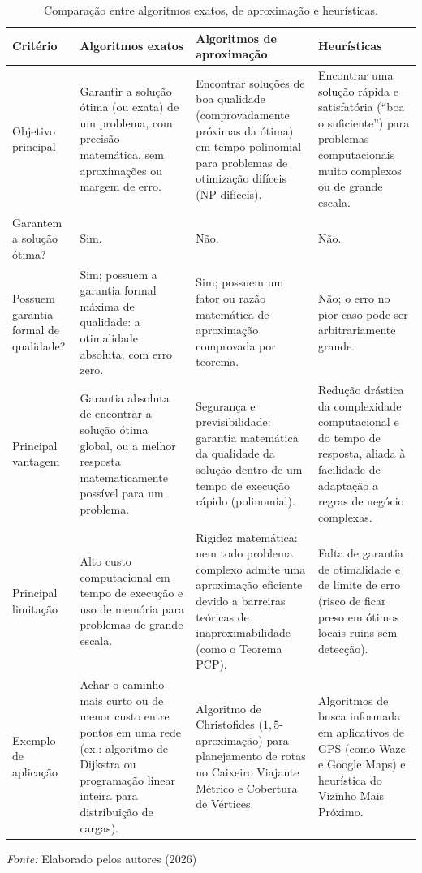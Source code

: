 \begin{table}[!ht]
\centering
\caption{Comparação entre algoritmos exatos, de aproximação e heurísticas.}
\label{tab:comparacao-abordagens}
\begin{tabular}{p{3.2cm}p{3.6cm}p{3.8cm}p{3.6cm}}
\hline
\textbf{Critério} & \textbf{Algoritmos exatos} & \textbf{Algoritmos de aproximação} & \textbf{Heurísticas} \\
\hline
Objetivo principal & Garantir a solução ótima (ou exata) de um problema, com precisão matemática, sem aproximações ou margem de erro. & Encontrar soluções de boa qualidade (comprovadamente próximas da ótima) em tempo polinomial para problemas de otimização difíceis (NP-difíceis). & Encontrar uma solução rápida e satisfatória (``boa o suficiente'') para problemas computacionais muito complexos ou de grande escala. \\
\hline
Garantem a solução ótima? & Sim. & Não. & Não. \\
\hline
Possuem garantia formal de qualidade? & Sim; possuem a garantia formal máxima de qualidade: a otimalidade absoluta, com erro zero. & Sim; possuem um fator ou razão matemática de aproximação comprovada por teorema. & Não; o erro no pior caso pode ser arbitrariamente grande. \\
\hline
Principal vantagem & Garantia absoluta de encontrar a solução ótima global, ou a melhor resposta matematicamente possível para um problema. & Segurança e previsibilidade: garantia matemática da qualidade da solução dentro de um tempo de execução rápido (polinomial). & Redução drástica da complexidade computacional e do tempo de resposta, aliada à facilidade de adaptação a regras de negócio complexas. \\
\hline
Principal limitação & Alto custo computacional em tempo de execução e uso de memória para problemas de grande escala. & Rigidez matemática: nem todo problema complexo admite uma aproximação eficiente devido a barreiras teóricas de inaproximabilidade (como o Teorema PCP). & Falta de garantia de otimalidade e de limite de erro (risco de ficar preso em ótimos locais ruins sem detecção). \\
\hline
Exemplo de aplicação & Achar o caminho mais curto ou de menor custo entre pontos em uma rede (ex.: algoritmo de Dijkstra ou programação linear inteira para distribuição de cargas). & Algoritmo de Christofides ($1{,}5$-aproximação) para planejamento de rotas no Caixeiro Viajante Métrico e Cobertura de Vértices. & Algoritmos de busca informada em aplicativos de GPS (como Waze e Google Maps) e heurística do Vizinho Mais Próximo. \\
\hline
\end{tabular}
\footnotesize{\textit{Fonte:} Elaborado pelos autores (2026)}
\end{table}


